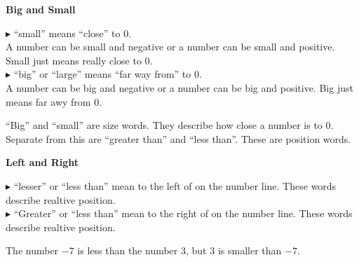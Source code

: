 \documentclass{ximera}
\begin{document}
\begin{idea} \textbf{\textcolor{blue!55!black}{Big and Small}} 

\textbf{\textcolor{blue!55!black}{$\blacktriangleright$}}  ``small'' means ``close'' to $0$. \\


A number can be small and negative or a number can be small and positive. Small just means really close to $0$. \\


\textbf{\textcolor{blue!55!black}{$\blacktriangleright$}}  ``big'' or ``large'' means ``far way from'' to $0$. \\


A number can be big and negative or a number can be big and positive. Big just means far awy from $0$. \\


\end{idea}


``Big'' and ``small'' are size words.  They describe how close a number is to $0$. \\

Separate from this are ``greater than'' and ``less than''.  These are position words. \\

\begin{idea} \textbf{\textcolor{blue!55!black}{Left and Right}} 


\textbf{\textcolor{blue!55!black}{$\blacktriangleright$}} ``lesser'' or ``less than'' mean to the left of on the number line. These words describe realtive position.\\


\textbf{\textcolor{blue!55!black}{$\blacktriangleright$}} ``Greater'' or ``less than'' mean to the right of on the number line. These words describe realtive position.\\




\end{idea}








\begin{example}


The number $-7$ is less than the number $3$, but $3$ is smaller than $-7$.



\end{example}
\end{document}
